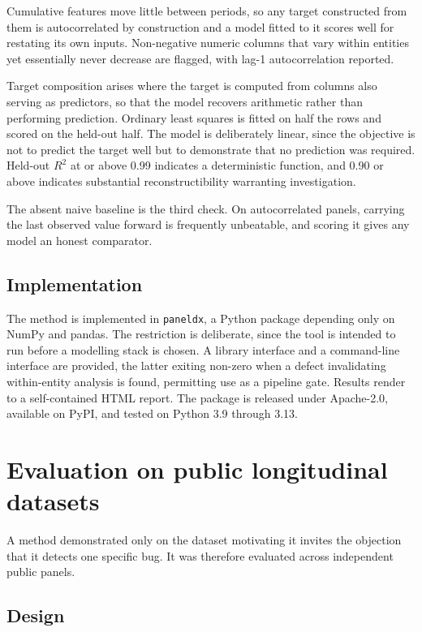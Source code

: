 \documentclass[preprint,12pt]{elsarticle}
\begin{document}
Cumulative features move little between periods, so any target constructed from
them is autocorrelated by construction and a model fitted to it scores well for
restating its own inputs. Non-negative numeric columns that vary within entities
yet essentially never decrease are flagged, with lag-1 autocorrelation reported.

Target composition arises where the target is computed from columns also serving
as predictors, so that the model recovers arithmetic rather than performing
prediction. Ordinary least squares is fitted on half the rows and scored on the
held-out half. The model is deliberately linear, since the objective is not to
predict the target well but to demonstrate that no prediction was required.
Held-out $R^2$ at or above 0.99 indicates a deterministic function, and 0.90 or
above indicates substantial reconstructibility warranting investigation.

The absent naive baseline is the third check. On autocorrelated panels, carrying
the last observed value forward is frequently unbeatable, and scoring it gives
any model an honest comparator.

\subsection{Implementation}

The method is implemented in \texttt{paneldx}, a Python package depending only
on NumPy and pandas. The restriction is deliberate, since the tool is intended
to run before a modelling stack is chosen. A library interface and a
command-line interface are provided, the latter exiting non-zero when a defect
invalidating within-entity analysis is found, permitting use as a pipeline gate.
Results render to a self-contained HTML report. The package is released under
Apache-2.0, available on PyPI, and tested on Python 3.9 through 3.13.

\section{Evaluation on public longitudinal datasets}

A method demonstrated only on the dataset motivating it invites the objection
that it detects one specific bug. It was therefore evaluated across independent
public panels.

\subsection{Design}
\end{document}
